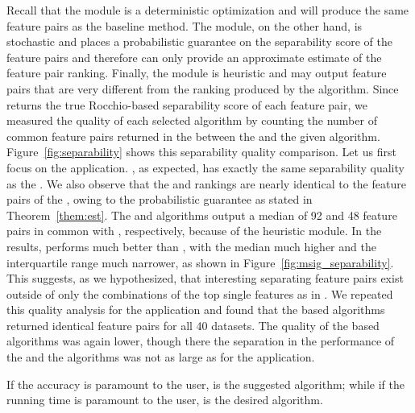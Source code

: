  Recall that the \earlyT module is a deterministic optimization and will produce the same \topk feature pairs as the baseline method. The \sampling module, on the other hand, is stochastic and places a probabilistic guarantee on the separability score of the feature pairs and therefore can only provide an approximate estimate of the \topk feature pair ranking. Finally, the \traversal module is heuristic and may output \topk feature pairs that are very different from the ranking produced by the \baseline algorithm. Since \baseline returns the true Rocchio-based separability score of each feature pair, we measured the quality of each selected algorithm by counting the number of common feature pairs returned in the \tophundred between the \baseline and the given algorithm. Figure~\ref{fig:separability} shows this separability quality comparison. Let us first focus on the \msig application. \earlyOrder, as expected, has exactly the same separability quality as the \baseline. We also observe that the \samp and \sampOpt rankings are nearly identical to the \tophundred feature pairs of the \baseline, owing to the probabilistic guarantee as stated in Theorem~\ref{them:est}. The \horiz and \vertic algorithms output a median of 92 and 48 feature pairs in common with \baseline, respectively, because of the heuristic \traversal module. In the \msig results, \horiz performs much better than \vertic, with the median much higher and the interquartile range much narrower, as shown in Figure~\ref{fig:msig_separability}. This suggests, as we hypothesized, that interesting separating feature pairs exist outside of only the combinations of the top single features as in \vertic. We repeated this quality analysis for the \lincs application and found that the \sampling based algorithms returned identical \tophundred feature pairs for all 40 datasets. The quality of the \traversal based algorithms was again lower, though there the separation in the performance of the \horiz and the \vertic algorithms was not as large as for the \msig application.

 If the accuracy is paramount to the user, \sampOpt is the suggested algorithm; while if the running time is paramount to the user, \horiz is the desired algorithm.



